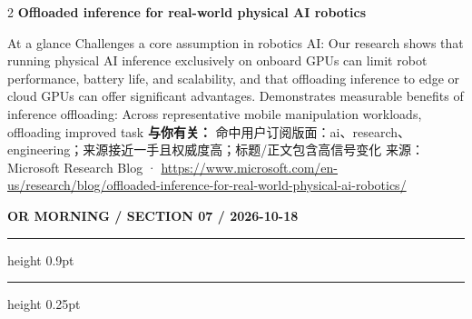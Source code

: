 \documentclass[10.5pt]{ctexart}
\begin{document}
\begin{multicols}{2}
\vspace{2mm}
{\large\bfseries Offloaded inference for real-world physical AI robotics}\par
At a glance Challenges a core assumption in robotics AI: Our research shows that running physical AI inference exclusively on onboard GPUs can limit robot performance, battery life, and scalability, and that offloading inference to edge or cloud GPUs can offer significant advantages. Demonstrates measurable benefits of inference offloading: Across representative mobile manipulation workloads, offloading improved task
\textbf{与你有关：} 命中用户订阅版面：ai、research、engineering；来源接近一手且权威度高；标题/正文包含高信号变化
{\footnotesize\color{ormuted} 来源：Microsoft Research Blog · \url{https://www.microsoft.com/en-us/research/blog/offloaded-inference-for-real-world-physical-ai-robotics/}}
\end{multicols}
\newpage
{\small\bfseries OR MORNING / SECTION 07 / 2026-10-18}
\vspace{2mm}
\hrule height 0.9pt
\vspace{1.5mm}
\hrule height 0.25pt
\vspace{4mm}
\end{document}
